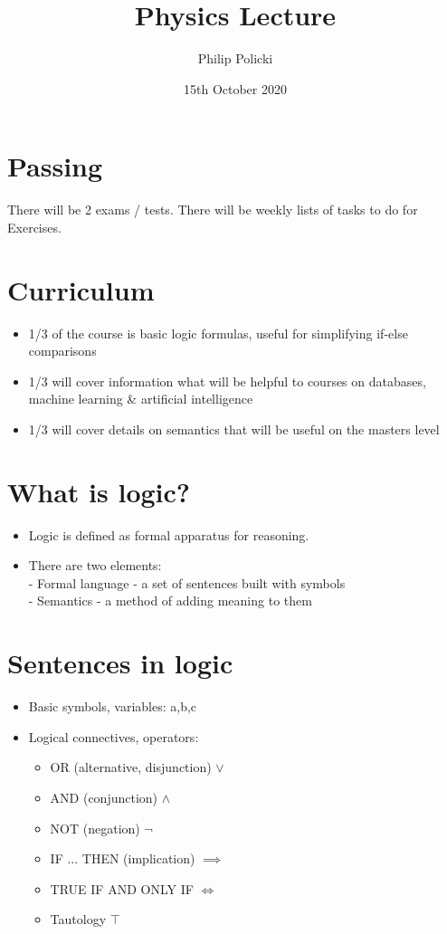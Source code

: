 \documentclass{article}
\title{Physics Lecture }
\author{Philip Policki}
\date{15th October 2020}
\begin{document}
\maketitle

\section{Passing}
There will be 2 exams / tests.
There will be weekly lists of tasks to do for Exercises. 

\section{Curriculum}
\begin{itemize}
	\item 1/3 of the course is basic logic formulas, useful for simplifying if-else comparisons
	\item 1/3 will cover information what will be helpful to courses on databases, machine learning \& artificial intelligence
	\item 1/3 will cover details on semantics that will be useful on the masters level
\end{itemize}

\section{What is logic?}
\begin{itemize}
	\item Logic is defined as formal apparatus for reasoning.
	\item There are two elements: \\ - Formal language - a set of sentences built with symbols \\ - Semantics - a method of adding meaning to them
\end{itemize}

\section{Sentences in logic}
\begin{itemize}
	\item Basic symbols, variables: a,b,c
	\item Logical connectives, operators:
	\begin{itemize}
		\item OR (alternative, disjunction) $\lor$
		\item AND (conjunction) $\land$
		\item NOT (negation) $\lnot$
		\item IF ... THEN (implication) $\implies$
		\item TRUE IF AND ONLY IF $ \iff $
		\item Tautology $ \top $
	\end{itemize}
\end{itemize}
\end{document}
